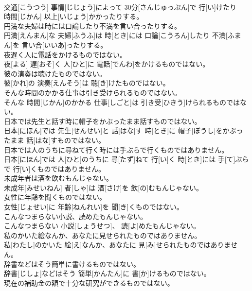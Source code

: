 \documentclass[8pt]{extreport}
\begin{document}
\begin{CJK}{UTF8}{min}
\\	交通[こうつう] 事情[じじょう]によって 30分[さんじゅっぷん]で 行[い]けたり 
\\	時間[じかん] 以上[いじょう]かかったりする。
\\	円満な夫婦は時には口論したり不満を言い合ったりする。	
\\	円満[えんまん]な 夫婦[ふうふ]は 時[とき]には 口論[こうろん]したり 不満[ふまん]を 言い合[いいあ]ったりする。
\\	夜遅く人に電話をかけるものではない。	
\\	夜[よる] 遅[おそ]く 人[ひと]に 電話[でんわ]をかけるものではない。
\\	彼の演奏は聴けたものではない。	
\\	彼[かれ]の 演奏[えんそう]は 聴[き]けたものではない。
\\	そんな時間のかかる仕事は引き受けられるものではない。	
\\	そんな 時間[じかん]のかかる 仕事[しごと]は 引き受[ひきう]けられるものではない。
\\	日本では先生と話す時に帽子をかぶったまま話すものではない。	
\\	日本[にほん]では 先生[せんせい]と 話[はな]す 時[とき]に 帽子[ぼうし]をかぶったまま 話[はな]すものではない。
\\	日本では人のうちに尋ねて行く時には手ぶらで行くものではありません。	
\\	日本[にほん]では 人[ひと]のうちに 尋[たず]ねて 行[い]く 時[とき]には 手[て]ぶらで 行[い]くものではありません。
\\	未成年者は酒を飲むもんじゃない。	
\\	未成年[みせいねん] 者[しゃ]は 酒[さけ]を 飲[の]むもんじゃない。
\\	女性に年齢を聞くものではない。	
\\	女性[じょせい]に 年齢[ねんれい]を 聞[き]くものではない。
\\	こんなつまらない小説、読めたもんじゃない。	
\\	こんなつまらない 小説[しょうせつ]、 読[よ]めたもんじゃない。
\\	私のかいた絵なんか、あなたに見せられたものではありません。	
\\	私[わたし]のかいた 絵[え]なんか、あなたに 見[み]せられたものではありません。
\\	辞書などはそう簡単に書けるものではない。	
\\	辞書[じしょ]などはそう 簡単[かんたん]に 書[か]けるものではない。
\\	現在の補助金の額で十分な研究ができるものではない。	

\end{CJK}
\end{document}
